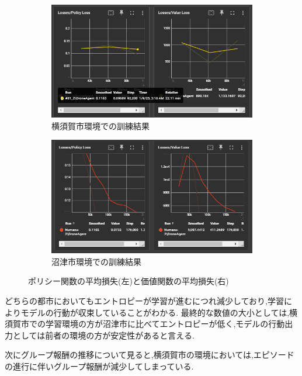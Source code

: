 \begin{figure}[H]
  \centering
  \begin{subfigure}{0.45\textwidth}
      \centering
      \includegraphics[width=\textwidth]{Figures/Yokosuka-Loss.png}
      \caption{横須賀市環境での訓練結果}
      \label{fig:YokosukaModel-Result2}
  \end{subfigure}
  \begin{subfigure}{0.45\textwidth}
      \centering
      \includegraphics[width=\textwidth]{Figures/Numazu-Loss.png}
      \caption{沼津市環境での訓練結果}
      \label{fig:NumazuModel-Result2}
  \end{subfigure}
  \caption{ポリシー関数の平均損失(左)と価値関数の平均損失(右)}
  \label{fig:Model-Result-Errors}
\end{figure}
どちらの都市においてもエントロピーが学習が進むにつれ減少しており,学習によりモデルの行動が収束していることがわかる.
最終的な数値の大小としては,横須賀市での学習環境の方が沼津市に比べてエントロピーが低く,モデルの行動出力としては前者の環境の方が安定性があると言える.\par 
次にグループ報酬の推移について見ると,横須賀市の環境においては,エピソードの進行に伴いグループ報酬が減少してしまっている.
